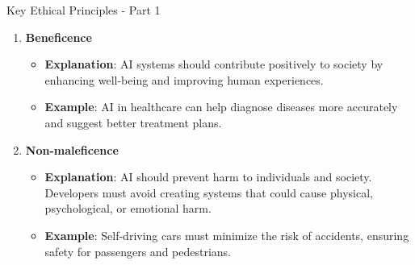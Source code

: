 \documentclass[aspectratio=169]{beamer}
\begin{document}
\begin{frame}[fragile]{Key Ethical Principles - Part 1}
    \begin{enumerate}
        \item \textbf{Beneficence}
        \begin{itemize}
            \item \textbf{Explanation}: AI systems should contribute positively to society by enhancing well-being and improving human experiences.
            \item \textbf{Example}: AI in healthcare can help diagnose diseases more accurately and suggest better treatment plans.
        \end{itemize}
        
        \item \textbf{Non-maleficence}
        \begin{itemize}
            \item \textbf{Explanation}: AI should prevent harm to individuals and society. Developers must avoid creating systems that could cause physical, psychological, or emotional harm.
            \item \textbf{Example}: Self-driving cars must minimize the risk of accidents, ensuring safety for passengers and pedestrians.
        \end{itemize}
    \end{enumerate}
\end{frame}
\end{document}

